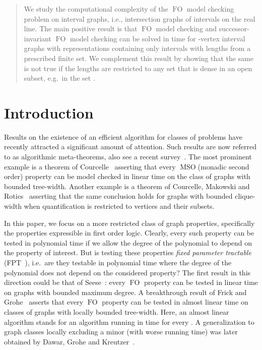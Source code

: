 \documentclass{CSML}
\newcommand{\FO}{\ensuremath{\operatorname{FO}}\xspace}
\newcommand{\MSO}{\ensuremath{\operatorname{MSO}}\xspace}
\theoremstyle{plain}\newtheorem{claim}[thm]{Claim}
\begin{document}
\begin{abstract}
We study the computational complexity of the \FO model checking problem on
interval graphs, i.e., intersection graphs of intervals on the real line.
The main positive result is that \FO model checking and
successor-invariant \FO model checking can be solved
in time  for -vertex interval graphs with representations
containing only intervals with lengths from a prescribed finite set.
We complement this result by showing that the same is not true
if the lengths are restricted to any set that is dense in an open subset,
e.g.~in the set .
\end{abstract}


\maketitle\hfill

\section{Introduction}


Results on the existence of an efficient algorithm for classes of
problems have recently attracted a significant amount of attention. Such results
are now referred to as algorithmic meta-theorems, also see a recent survey~\cite{kre09}.
The most prominent example is a theorem of Courcelle~\cite{cou90}
asserting that every \MSO (monadic second order) property can be model checked in linear time on the class of
graphs with bounded tree-width. Another example is a theorem of Courcelle, Makowski and
Rotics~\cite{cmr00} asserting that the same conclusion holds for graphs
with bounded clique-width when quantification is restricted to vertices and
their subsets.

In this paper, we focus on a more restricted class of graph properties,
specifically the properties expressible
in first order logic. Clearly, every such property can be tested in polynomial time
if we allow the degree of the polynomial to depend on the property of interest.
But is testing these properties {\em fixed parameter tractable}
(FPT~\cite{df13}), i.e.~are they testable in polynomial time where the degree of the polynomial does
not depend on the considered property?
The first result
in this direction could be that of Seese~\cite{see96}: every \FO property
can be tested in linear time on graphs with bounded maximum degree. A breakthrough
result of Frick and Grohe~\cite{fg01} asserts that every \FO property can be tested in almost
linear time on classes of graphs with locally bounded tree-width. Here, an almost
linear algorithm stands for an algorithm running in time 
for every .
A generalization to graph classes locally excluding a minor (with worse running time)
was later obtained by Dawar, Grohe and Kreutzer~\cite{dgk07}. 
\end{document}
